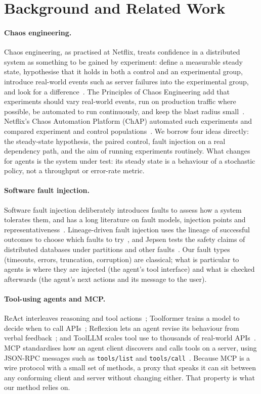 \section{Background and Related Work}\label{sec:background}

\paragraph{Chaos engineering.} Chaos engineering, as practised at Netflix, treats confidence in a distributed system as something to be gained by experiment: define a measurable steady state, hypothesise that it holds in both a control and an experimental group, introduce real-world events such as server failures into the experimental group, and look for a difference~\cite{basiri2016chaos}. The Principles of Chaos Engineering add that experiments should vary real-world events, run on production traffic where possible, be automated to run continuously, and keep the blast radius small~\cite{principlesofchaos}. Netflix's Chaos Automation Platform (ChAP) automated such experiments and compared experiment and control populations~\cite{blohowiak2016chap}. We borrow four ideas directly: the steady-state hypothesis, the paired control, fault injection on a real dependency path, and the aim of running experiments routinely. What changes for agents is the system under test: its steady state is a behaviour of a stochastic policy, not a throughput or error-rate metric.

\paragraph{Software fault injection.} Software fault injection deliberately introduces faults to assess how a system tolerates them, and has a long literature on fault models, injection points and representativeness~\cite{natella2016sfi}. Lineage-driven fault injection uses the lineage of successful outcomes to choose which faults to try~\cite{alvaro2015ldfi}, and Jepsen tests the safety claims of distributed databases under partitions and other faults~\cite{jepsen}. Our fault types (timeouts, errors, truncation, corruption) are classical; what is particular to agents is where they are injected (the agent's tool interface) and what is checked afterwards (the agent's next actions and its message to the user).

\paragraph{Tool-using agents and MCP.} ReAct interleaves reasoning and tool actions~\cite{yao2022react}; Toolformer trains a model to decide when to call APIs~\cite{schick2023toolformer}; Reflexion lets an agent revise its behaviour from verbal feedback~\cite{shinn2023reflexion}; and ToolLLM scales tool use to thousands of real-world APIs~\cite{qin2023toolllm}. MCP standardises how an agent client discovers and calls tools on a server, using JSON-RPC messages such as \texttt{tools/list} and \texttt{tools/call}~\cite{mcpspec}. Because MCP is a wire protocol with a small set of methods, a proxy that speaks it can sit between any conforming client and server without changing either. That property is what our method relies on.

